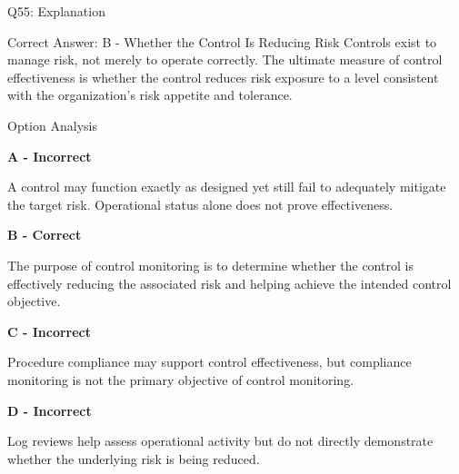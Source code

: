 \documentclass{beamer}
\begin{document}
	\begin{frame}[shrink=10]{Q55: Explanation}
		\footnotesize
		
		\begin{block}{Correct Answer: B - Whether the Control Is Reducing Risk}
			Controls exist to manage risk, not merely to operate correctly.
			The ultimate measure of control effectiveness is whether the
			control reduces risk exposure to a level consistent with the
			organization's risk appetite and tolerance.
		\end{block}
		
		\begin{block}{Option Analysis}
			
			\textbf{A - Incorrect}
			
			A control may function exactly as designed yet still fail to
			adequately mitigate the target risk. Operational status alone
			does not prove effectiveness.
			
			\vspace{0.15cm}
			
			\textbf{B - Correct}
			
			The purpose of control monitoring is to determine whether the
			control is effectively reducing the associated risk and helping
			achieve the intended control objective.
			
			\vspace{0.15cm}
			
			\textbf{C - Incorrect}
			
			Procedure compliance may support control effectiveness, but
			compliance monitoring is not the primary objective of control
			monitoring.
			
			\vspace{0.15cm}
			
			\textbf{D - Incorrect}
			
			Log reviews help assess operational activity but do not directly
			demonstrate whether the underlying risk is being reduced.
			
		\end{block}

		
	\end{frame}
	
\end{document}
